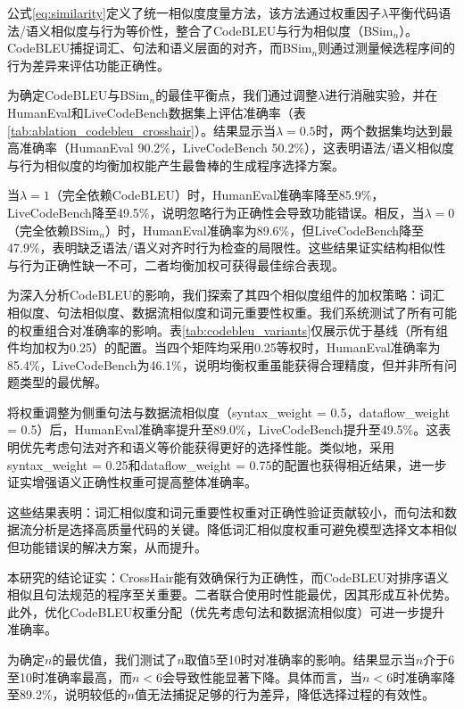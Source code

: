 \documentclass{article}
\newcommand{\tool}{EnsLLM}
\begin{document}
\begin{CJK*}{UTF8}{gbsn}
\leavevmode\par
公式\ref{eq:similarity}定义了统一相似度度量方法，该方法通过权重因子\(\lambda\)平衡代码语法/语义相似度与行为等价性，整合了CodeBLEU与行为相似度（BSim\(_n\)）。CodeBLEU捕捉词汇、句法和语义层面的对齐，而BSim\(_n\)则通过测量候选程序间的行为差异来评估功能正确性。

为确定CodeBLEU与BSim\(_n\)的最佳平衡点，我们通过调整\(\lambda\)进行消融实验，并在HumanEval和LiveCodeBench数据集上评估准确率（表\ref{tab:ablation_codebleu_crosshair}）。结果显示当\(\lambda = 0.5\)时，两个数据集均达到最高准确率（HumanEval 90.2\%，LiveCodeBench 50.2\%），这表明语法/语义相似度与行为相似度的均衡加权能产生最鲁棒的生成程序选择方案。

当\(\lambda = 1\)（完全依赖CodeBLEU）时，HumanEval准确率降至85.9\%，LiveCodeBench降至49.5\%，说明忽略行为正确性会导致功能错误。相反，当\(\lambda = 0\)（完全依赖BSim\(_n\)）时，HumanEval准确率为89.6\%，但LiveCodeBench降至47.9\%，表明缺乏语法/语义对齐时行为检查的局限性。这些结果证实结构相似性与行为正确性缺一不可，二者均衡加权可获得最佳综合表现。

为深入分析CodeBLEU的影响，我们探索了其四个相似度组件的加权策略：词汇相似度、句法相似度、数据流相似度和词元重要性权重。我们系统测试了所有可能的权重组合对准确率的影响。表\ref{tab:codebleu_variants}仅展示优于基线（所有组件均加权为0.25）的配置。当四个矩阵均采用0.25等权时，HumanEval准确率为85.4\%，LiveCodeBench为46.1\%，说明均衡权重虽能获得合理精度，但并非所有问题类型的最优解。

将权重调整为侧重句法与数据流相似度（syntax\_weight = 0.5，dataflow\_weight = 0.5）后，HumanEval准确率提升至89.0\%，LiveCodeBench提升至49.5\%。这表明优先考虑句法对齐和语义等价能获得更好的选择性能。类似地，采用syntax\_weight = 0.25和dataflow\_weight = 0.75的配置也获得相近结果，进一步证实增强语义正确性权重可提高整体准确率。

这些结果表明：词汇相似度和词元重要性权重对正确性验证贡献较小，而句法和数据流分析是选择高质量代码的关键。降低词汇相似度权重可避免模型选择文本相似但功能错误的解决方案，从而提升。

本研究的结论证实：CrossHair能有效确保行为正确性，而CodeBLEU对排序语义相似且句法规范的程序至关重要。二者联合使用时性能最优，因其形成互补优势。此外，优化CodeBLEU权重分配（优先考虑句法和数据流相似度）可进一步提升准确率。

为确定\( n \)的最优值，我们测试了\( n \)取值5至10时对准确率的影响。结果显示当\( n \)介于6至10时准确率最高，而\( n < 6 \)会导致性能显著下降。具体而言，当\( n < 6 \)时准确率降至89.2\%，说明较低的\( n \)值无法捕捉足够的行为差异，降低选择过程的有效性。


\end{CJK*}
\end{document}
